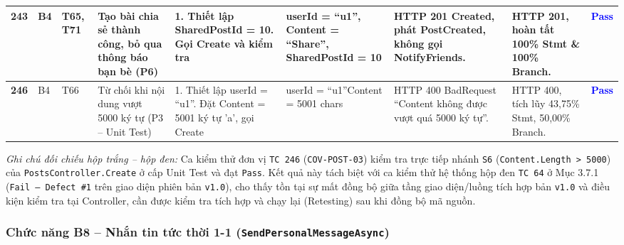 \documentclass[11pt,a4paper]{article}
\begin{document}
\begin{longtable}{|C{0.8cm}|C{0.75cm}|C{0.95cm}|L{2.0cm}|L{3.0cm}|L{2.25cm}|L{2.6cm}|L{2.5cm}|C{0.85cm}|}
\textbf{243} & B4 & T65, T71 & Tạo bài chia sẻ thành công, bỏ qua thông báo bạn bè (P6) & 1. Thiết lập SharedPostId = 10. Gọi Create và kiểm tra & userId = ``u1'', Content = ``Share'', SharedPostId = 10 & HTTP 201 Created, phát PostCreated, không gọi NotifyFriends. & HTTP 201, hoàn tất 100\% Stmt \& 100\% Branch. & \textcolor{blue}{\textbf{Pass}} \\ \hline
\textbf{246} & B4 & T66 & Từ chối khi nội dung vượt 5000 ký tự (P3 -- Unit Test) & 1. Thiết lập userId = ``u1''. Đặt Content = 5001 ký tự 'a', gọi Create & userId = ``u1''\newline Content = 5001 chars & HTTP 400 BadRequest ``Content không được vượt quá 5000 ký tự''. & HTTP 400, tích lũy 43,75\% Stmt, 50,00\% Branch. & \textcolor{blue}{\textbf{Pass}} \\ \hline
\end{longtable}
\endgroup

\noindent\textit{Ghi chú đối chiếu hộp trắng -- hộp đen:} Ca kiểm thử đơn vị \texttt{TC 246} (\texttt{COV-POST-03}) kiểm tra trực tiếp nhánh \texttt{S6} (\texttt{Content.Length > 5000}) của \texttt{PostsController.Create} ở cấp Unit Test và đạt \texttt{Pass}. Kết quả này tách biệt với ca kiểm thử hệ thống hộp đen \texttt{TC 64} ở Mục 3.7.1 (\texttt{Fail -- Defect \#1} trên giao diện phiên bản \texttt{v1.0}), cho thấy tồn tại sự mất đồng bộ giữa tầng giao diện/luồng tích hợp bản \texttt{v1.0} và điều kiện kiểm tra tại Controller, cần được kiểm tra tích hợp và chạy lại (Retesting) sau khi đồng bộ mã nguồn.

\subsubsection{Chức năng B8 -- Nhắn tin tức thời 1-1 (\texttt{SendPersonalMessageAsync})}
\end{document}
